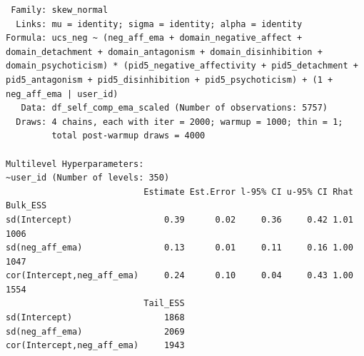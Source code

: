 \documentclass[
  11pt,
  a4paper,
  onecolumn]{article}
\begin{document}
\begin{verbatim}
 Family: skew_normal 
  Links: mu = identity; sigma = identity; alpha = identity 
Formula: ucs_neg ~ (neg_aff_ema + domain_negative_affect + domain_detachment + domain_antagonism + domain_disinhibition + domain_psychoticism) * (pid5_negative_affectivity + pid5_detachment + pid5_antagonism + pid5_disinhibition + pid5_psychoticism) + (1 + neg_aff_ema | user_id) 
   Data: df_self_comp_ema_scaled (Number of observations: 5757) 
  Draws: 4 chains, each with iter = 2000; warmup = 1000; thin = 1;
         total post-warmup draws = 4000

Multilevel Hyperparameters:
~user_id (Number of levels: 350) 
                           Estimate Est.Error l-95% CI u-95% CI Rhat Bulk_ESS
sd(Intercept)                  0.39      0.02     0.36     0.42 1.01     1006
sd(neg_aff_ema)                0.13      0.01     0.11     0.16 1.00     1047
cor(Intercept,neg_aff_ema)     0.24      0.10     0.04     0.43 1.00     1554
                           Tail_ESS
sd(Intercept)                  1868
sd(neg_aff_ema)                2069
cor(Intercept,neg_aff_ema)     1943


\end{verbatim}
\end{document}
